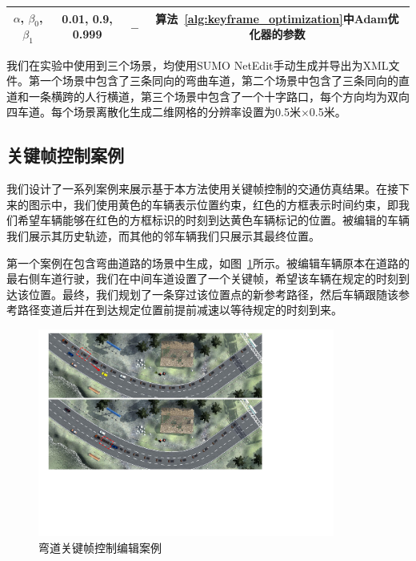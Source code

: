\begin{table}[!htb]
\begin{tabular}{|c|c|c|c|}
$\alpha$, $\beta_0$, $\beta_1$ & 0.01, 0.9, 0.999 & $-$ & 算法~\ref{alg:keyframe_optimization}中Adam优化器的参数 \\ \hline
  
\end{tabular}
\label{tab:keyframe_parameters}
\end{table}

我们在实验中使用到三个场景，均使用SUMO NetEdit手动生成并导出为XML文件。第一个场景中包含了三条同向的弯曲车道，第二个场景中包含了三条同向的直道和一条横跨的人行横道，第三个场景中包含了一个十字路口，每个方向均为双向四车道。每个场景离散化生成二维网格的分辨率设置为0.5米$\times$0.5米。

\subsection{关键帧控制案例}
\label{section:keyframe_cases}




我们设计了一系列案例来展示基于本方法使用关键帧控制的交通仿真结果。在接下来的图示中，我们使用黄色的车辆表示位置约束，红色的方框表示时间约束，即我们希望车辆能够在红色的方框标识的时刻到达黄色车辆标记的位置。被编辑的车辆我们展示其历史轨迹，而其他的邻车辆我们只展示其最终位置。


第一个案例在包含弯曲道路的场景中生成，如图~\ref{fig:keyframe_teaser}所示。被编辑车辆原本在道路的最右侧车道行驶，我们在中间车道设置了一个关键帧，希望该车辆在规定的时刻到达该位置。最终，我们规划了一条穿过该位置点的新参考路径，然后车辆跟随该参考路径变道后并在到达规定位置前提前减速以等待规定的时刻到来。

\begin{figure}[!tbh]
\centering
\includegraphics[width=0.87\textwidth]{figure/keyframe/case_bend_new_v2.pdf}
\caption[弯道超车关键帧控制编辑案例]{
弯道关键帧控制编辑案例
}
\label{fig:keyframe_teaser}
\end{figure}


